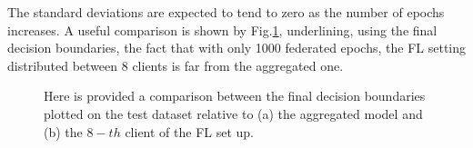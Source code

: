 \documentclass{article} %
\begin{document}
\newpage
The standard deviations are expected to tend to zero as the number of epochs increases.
A useful comparison is shown by Fig.\ref{fig5}, underlining, using the final decision 
boundaries, the fact that with only 1000 federated epochs, the FL setting distributed 
between 8 clients is far from the aggregated one.
\begin{figure}[!h]
    \centering
    \caption{Here is provided a comparison between the final decision boundaries plotted on 
        the test dataset relative to (a) the aggregated model and (b) the $8-th$ client of 
        the FL set up.}
    \label{fig5}
\end{figure}
\end{document}
